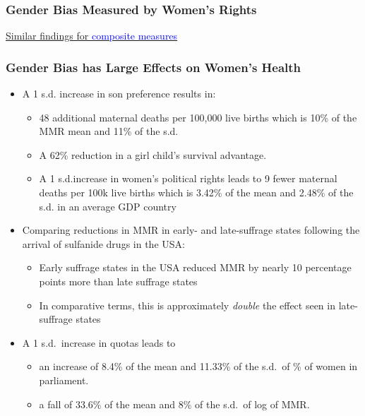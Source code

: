 \documentclass[10pt,letterpaper,subeqn]{beamer}
\begin{document}
\begin{frame}[label=Rights]
\frametitle{Gender Bias Measured by  Women's Rights}

\hyperlink{RightsComp}{Similar findings for \textcolor{blue}{composite measures}}
\end{frame}


\begin{frame}
\frametitle{Gender Bias has Large Effects on Women's Health}
\begin{itemize}
	\item A 1 s.d. increase in son preference results in:
	\begin{itemize}
		\item 48 additional maternal deaths per 100,000 live births which is 10\% of the MMR mean and 11\% of the s.d.
		\item A 62\% reduction in a girl child's survival advantage.  
		\item A 1 s.d.increase in women's political rights leads to 9 fewer maternal deaths per 100k live births which is 3.42\% of the mean and 2.48\% of the s.d. in an average GDP country
	\end{itemize}
	\item Comparing reductions in MMR in early- and late-suffrage states following the arrival of sulfanide drugs in the USA:
		
\begin{itemize}
		\item Early suffrage states in the USA reduced MMR by nearly 10 percentage points more than late suffrage states
		\item In comparative terms, this is approximately \emph{double} the effect seen in late-suffrage states
\end{itemize}

		\item A 1 s.d.\ increase in quotas leads to
		\begin{itemize}
		\item an increase of 8.4\% of the mean and 11.33\% of the s.d.\ of \% of women in parliament.
		\item a fall of 33.6\% of the mean and 8\% of the s.d.\ of log of MMR.
\end{itemize}
\end{itemize}
\end{frame}
\end{document}
